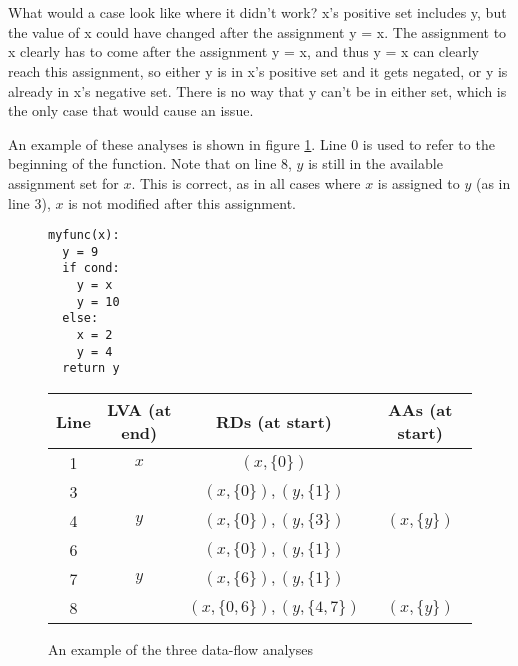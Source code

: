 \documentclass[12pt,twoside,notitlepage]{report}
\begin{document}
\begin{itemize}
{\begin{itemize}
			\\\\
			What would a case look like where it didn't work? x's positive set includes y, but the value of x could have changed after the assignment y = x. The assignment to x clearly has to come after the assignment y = x, and thus y = x can clearly reach this assignment, so either y is in x's positive set and it gets negated, or y is already in x's negative set. There is no way that y can't be in either set, which is the only case that would cause an issue.
	\end{itemize}}
\end{itemize}
An example of these analyses is shown in figure \ref{fig:dataflow}. Line 0 is used to refer to the beginning of the function. Note that on line 8, $y$ is still in the available assignment set for $x$. This is correct, as in all cases where $x$ is assigned to $y$ (as in line 3), $x$ is not modified after this assignment.
\begin{figure}[h]
	\begin{minipage}{0.3\linewidth}
	\begin{verbatim}
myfunc(x):
  y = 9
  if cond:
    y = x
    y = 10
  else:
    x = 2
    y = 4
  return y
	\end{verbatim}
	\end{minipage}
	\begin{minipage}{0.7\linewidth}
		\begin{center}
			\begin{tabular}{|c|c|c|c|}
				\hline
				Line & LVA (at end) & RDs (at start) & AAs (at start) \\
				\hline
				1 & $x$ & $(x, \{0\})$ & \\
				\hline
				3 & & $(x, \{0\}), (y, \{1\})$ & \\
				4 & $y$ & $(x, \{0\}), (y, \{3\})$ & $(x, \{y\})$ \\
				\hline
				6 & & $(x, \{0\}), (y, \{1\})$ & \\
				7 & $y$ & $(x, \{6\}), (y, \{1\})$ & \\
				\hline
				8 & & $(x, \{0, 6\}), (y, \{4, 7\})$ & $(x, \{y\})$ \\
				\hline
			\end{tabular}
		\end{center}
	\end{minipage}
	\caption{An example of the three data-flow analyses}
	\label{fig:dataflow}
\end{figure}
\\\\
\end{document}
